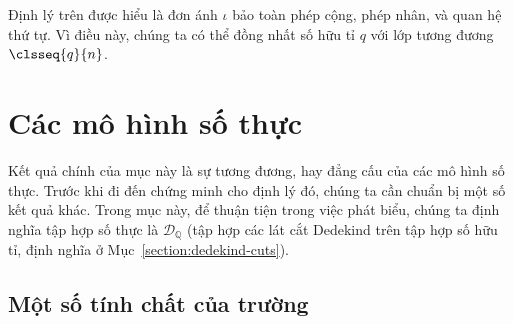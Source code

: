 Định lý trên được hiểu là đơn ánh $\iota$ bảo toàn phép cộng, phép nhân, và quan hệ thứ tự. Vì điều này, chúng ta có thể đồng nhất số hữu tỉ $q$ với lớp tương đương $\clsseq{q}{n}$.

\section{Các mô hình số thực}

Kết quả chính của mục này là sự tương đương, hay đẳng cấu của các mô hình số thực. Trước khi đi đến chứng minh cho định lý đó, chúng ta cần chuẩn bị một số kết quả khác. Trong mục này, để thuận tiện trong việc phát biểu, chúng ta định nghĩa tập hợp số thực là $\mathscr{D}_{\mathbb{Q}}$ (tập hợp các lát cắt Dedekind trên tập hợp số hữu tỉ, định nghĩa ở Mục~\ref{section:dedekind-cuts}).

\subsection{Một số tính chất của trường}

